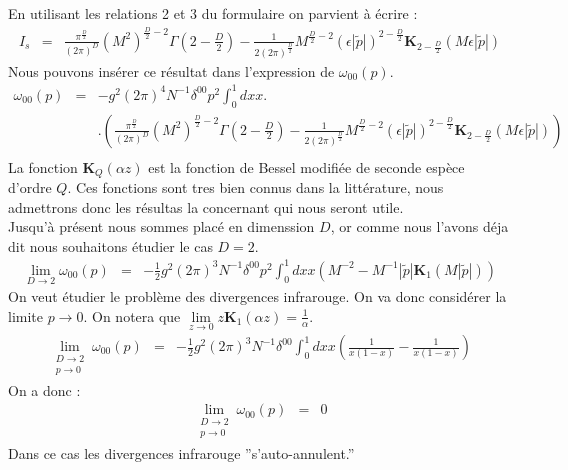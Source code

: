 \documentclass[a4paper,11pt]{article}
\theoremstyle{plain}
\theoremstyle{definition}
\theoremstyle{remark}
\numberwithin{equation}{section}
\numberwithin{equation}{subsection}
\numberwithin{figure}{section}
\begin{document}
En utilisant les relations 2 et 3 du formulaire on parvient à écrire :
\begin{eqnarray}
 I_{s}  &=&  \frac{ \pi^{\frac{D}{2}} }{ (2 \pi)^{D}  }  (M^2)^{\frac{D}{2}-2} \Gamma(2-\frac{D}{2})
-  \frac{1}{2 (2 \pi )^{\frac{D}{2}}}  M^{\frac{D}{2} - 2}  \left( \epsilon \left| \tilde{p}  \right|  \right)^{ 2-\frac{D}{2} }   
\textbf{K}_{2- \frac{D}{2}  } ( M \epsilon  \left| \tilde{p}  \right|  )
\end{eqnarray}
Nous pouvons insérer ce résultat dans l'expression de $ \omega_{00}(p)$. 
\begin{eqnarray}
 \omega_{00}(p) &=&  - g^2  (2 \pi)^4  N^{-1}   \delta^{00}   p^2
\int_{0}^{1}  dx  x  . \nonumber \\
&&  .\left(
\frac{ \pi^{\frac{D}{2}} }{ (2 \pi)^{D}  }  (M^2)^{\frac{D}{2}-2} \Gamma(2-\frac{D}{2})
-  \frac{1}{2 (2 \pi )^{\frac{D}{2}}}  M^{\frac{D}{2} - 2}  \left( \epsilon \left| \tilde{p}  \right|  \right)^{ 2-\frac{D}{2} }   
\textbf{K}_{2- \frac{D}{2}  } ( M \epsilon  \left| \tilde{p}  \right|  )
\right)    \nonumber  \\
\end{eqnarray}
La fonction $\textbf{K}_{Q } (\alpha z)$ est la fonction de Bessel modifiée de seconde espèce d'ordre $Q$. Ces fonctions sont tres bien 
connus dans la littérature, nous admettrons donc les résultas la concernant qui nous seront utile. \\
Jusqu'à présent nous sommes placé en dimenssion $D$, or comme nous l'avons déja dit nous souhaitons étudier le cas $D=2$.
\begin{eqnarray}
 \lim\limits_{D \to 2}   \omega_{00}(p)  &=&   - \frac{1}{2}  g^2  (2 \pi)^3  N^{-1} \delta^{00} p^2
\int_{0}^{1}  dx  x
\left(
M^{-2} 
-   M^{-1}  \left| \tilde{p}  \right|  \textbf{K}_{ 1 } ( M  \left| \tilde{p}  \right|  )
\right)
\end{eqnarray}
On veut étudier le problème des divergences infrarouge. On va donc considérer la limite $p \to 0$. On notera que
$ \lim\limits_{z \to 0} z \textbf{K}_{1 } (\alpha z) = \frac{1}{\alpha}$.
\begin{eqnarray}
 \lim\limits_{
\begin{array}{l}
D \to 2\\
p \to 0
\end{array}}   \omega_{00}(p)  &=&   - \frac{1}{2}  g^2  (2 \pi)^3  N^{-1} \delta^{00}
\int_{0}^{1}  dx  x
\left(
 \frac{1}{x(1-x)} 
-  \frac{1}{x(1-x)} 
\right)      
\end{eqnarray}
On a donc :
\begin{eqnarray}
 \lim\limits_{
\begin{array}{l}
D \to 2\\
p \to 0
\end{array}}   \omega_{00}(p)  &=&  0
\end{eqnarray}
Dans ce cas les divergences infrarouge ''s'auto-annulent.''
\end{document}
